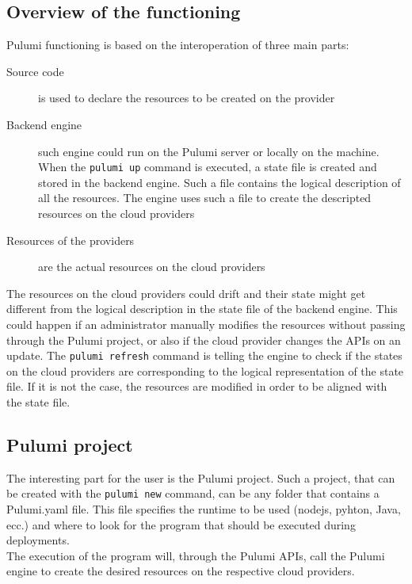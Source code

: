 \subsection{Overview of the functioning}
Pulumi functioning is based on the interoperation of three main parts:
\begin{description}
  \item[Source code] is used to declare the resources to be created on the provider
  \item[Backend engine] such engine could run on the Pulumi server or locally on the machine. When the \texttt{pulumi up} command is executed, a state file is created and stored in the backend engine. Such a file contains the logical description of all the resources. The engine uses such a file to create the descripted resources on the cloud providers
  \item[Resources of the providers] are the actual resources on the cloud providers
\end{description}
The resources on the cloud providers could drift and their state might get different from the logical description in the state file of the backend engine.
This could happen if an administrator manually modifies the resources without passing through the Pulumi project, or also if the cloud provider changes the APIs on an update.
The \texttt{pulumi refresh} command is telling the engine to check if the states on the cloud providers are corresponding to the logical representation of the state file.
If it is not the case, the resources are modified in order to be aligned with the state file.


\subsection{Pulumi project}
The interesting part for the user is the Pulumi project.
Such a project, that can be created with the \texttt{pulumi new} command, can be any folder that contains a Pulumi.yaml file.
This file specifies the runtime to be used (nodejs, pyhton, Java, ecc.) and where to look for the program that should be executed during deployments.\\
The execution of the program will, through the Pulumi APIs, call the Pulumi engine to create the desired resources on the respective cloud providers.

